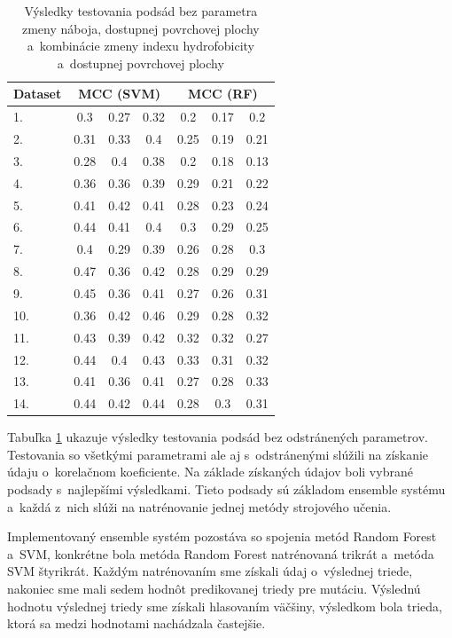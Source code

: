 \begin{table}[H]
	\centering
	\begin{tabular}{|l |c |c |c |c |c |c|}
	\hline
	Dataset & \multicolumn{3}{c|}{MCC (SVM)} & \multicolumn{3}{c|}{MCC (RF)} \\ \cline{1-7}
	\hline 
	1. & 0.3 & 0.27 & 0.32 & 0.2 & 0.17 & 0.2 \\ \cline{1-7} 
	2. & 0.31 & 0.33 & 0.4 & 0.25 & 0.19 & 0.21\\ \cline{1-7} 
	3. & 0.28 & 0.4 & 0.38 & 0.2 & 0.18 & 0.13 \\ \cline{1-7}
	4. & 0.36 & 0.36 & 0.39 & 0.29 & 0.21 & 0.22 \\ \cline{1-7}
	5. & 0.41 & 0.42 & 0.41 & 0.28 & 0.23 & 0.24\\ \cline{1-7}
	6. & 0.44 & 0.41 & 0.4 & 0.3 & 0.29 & 0.25\\ \cline{1-7}
	7. & 0.4 & 0.29 & 0.39 & 0.26 & 0.28 & 0.3\\ \cline{1-7}
	8. & 0.47 & 0.36 & 0.42 & 0.28 & 0.29 & 0.29\\ \cline{1-7}
	9. & 0.45 & 0.36 & 0.41 & 0.27 & 0.26 & 0.31\\ \cline{1-7}
	10.& 0.36 & 0.42 & 0.46 & 0.29 & 0.28 & 0.32\\ \cline{1-7}
	11.& 0.43 & 0.39 & 0.42 & 0.32 & 0.32 & 0.27\\ \cline{1-7}
	12.& 0.44 & 0.4 & 0.43  & 0.33 & 0.31 & 0.32\\ \cline{1-7}
	13.& 0.41 & 0.36  & 0.41 & 0.27 & 0.28 & 0.33\\ \cline{1-7}
	14.& 0.44 & 0.42 & 0.44 & 0.28 & 0.3 &  0.31\\ \cline{1-7}
	\hline
	\end{tabular}
\caption {Výsledky testovania podsád bez parametra zmeny náboja, dostupnej povrchovej plochy a~kombinácie zmeny indexu hydrofobicity a~dostupnej povrchovej plochy} 
\label{pythontest1} 
\end{table}


Tabuľka \ref{pythontest1} ukazuje výsledky testovania podsád bez odstránených parametrov. Testovania so všetkými parametrami ale aj s~odstránenými slúžili na získanie údaju o~korelačnom koeficiente. Na základe získaných údajov boli vybrané podsady s~najlepšími výsledkami. Tieto podsady sú základom ensemble systému a~každá z~nich slúži na natrénovanie jednej metódy strojového učenia.

Implementovaný ensemble systém pozostáva so spojenia metód Random Forest a~SVM, konkrétne bola metóda Random Forest natrénovaná trikrát a~metóda SVM štyrikrát. Každým natrénovaním sme získali údaj o~výslednej triede, nakoniec sme mali sedem hodnôt predikovanej triedy pre mutáciu. Výslednú hodnotu výslednej triedy sme získali hlasovaním väčšiny, výsledkom bola trieda, ktorá sa medzi hodnotami nachádzala častejšie.

